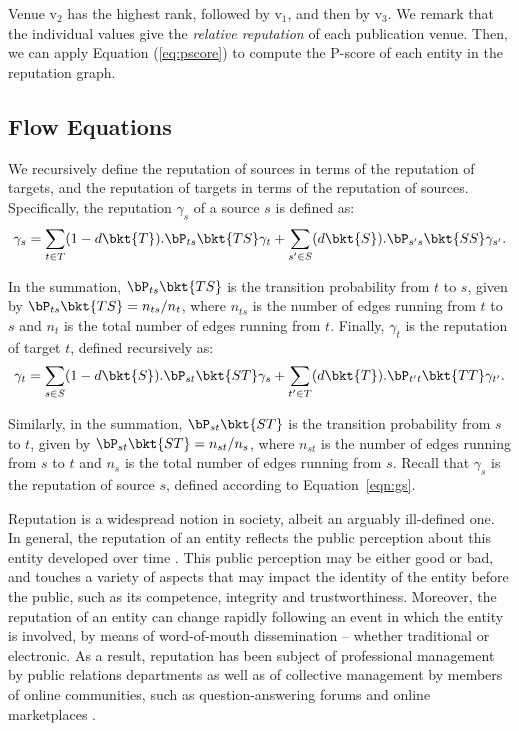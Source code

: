 Venue $\mbox{v}_2$ has the highest rank, followed by $\mbox{v}_1$, and then by $\mbox{v}_3$. We remark that the individual values give the {\em relative reputation} of each publication venue. 
%
Then, we can apply Equation (\ref{eq:pscore}) to compute the P-score of each entity in the reputation graph.



\subsection{Flow Equations}\label{sec:flow-equations}

We recursively define the reputation of sources in terms of the reputation of targets, and the reputation of targets in terms of the reputation of sources. Specifically, the reputation $\gamma_s$ of a source $s$ is defined as:
\begin{align}
  \gamma_s = \sum_{t \in T} (1-d\bkt{T}).\bP_{ts}\bkt{TS} \gamma_t + \sum_{s' \in S} (d\bkt{S}).\bP_{s's}\bkt{SS} \gamma_{s'}.\label{eqn:gs}
\end{align}

In the summation, $\bP_{ts}\bkt{TS}$ is the transition probability from $t$ to $s$, given by $\bP_{ts}\bkt{TS} = n_{ts} / n_t$, where $n_{ts}$ is the number of edges running from $t$ to $s$ and $n_t$ is the total number of edges running from $t$. Finally, $\gamma_t$ is the reputation of target $t$, defined recursively as:
\begin{align}
  \gamma_t = \sum_{s \in S} (1-d\bkt{S}).\bP_{st}\bkt{ST} \gamma_s + \sum_{t' \in T} (d\bkt{T}).\bP_{t't}\bkt{TT} \gamma_{t'}.\label{eqn:gt}
\end{align}

Similarly, in the summation, $\bP_{st}\bkt{ST}$ is the transition probability from $s$ to $t$, given by $\bP_{st}\bkt{ST} = n_{st} / n_s$, where $n_{st}$ is the number of edges running from $s$ to $t$ and $n_s$ is the total number of edges running from $s$. Recall that $\gamma_s$ is the reputation of source $s$, defined according to Equation~\eqref{eqn:gs}.



Reputation is a widespread notion in society, albeit an arguably ill-defined one. In general, the reputation of an entity reflects the public perception about this entity developed over time \cite{ribas2015random}. This public perception may be either good or bad, and touches a variety of aspects that may impact the identity of the entity before the public, such as its competence, integrity and trustworthiness. Moreover, the reputation of an entity can change rapidly following an event in which the entity is involved, by means of word-of-mouth dissemination -- whether traditional or electronic. As a result, reputation has been subject of professional management by public relations departments as well as of collective management by members of online communities, such as question-answering forums and online marketplaces \cite{hutton2001prr}.

